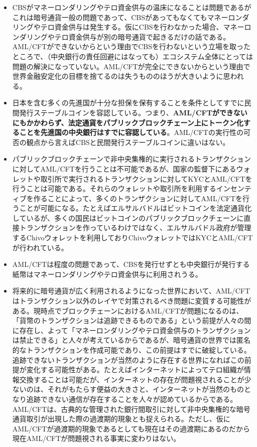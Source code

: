 \documentclass[dvipdfmx,a4paper]{jsarticle}
\begin{document}
\begin{itemize}
\item CBSがマネーロンダリングやテロ資金供与の温床になることは問題であるがこれは暗号通貨一般の問題であって、CBSがあってもなくてもマネーロンダリングやテロ資金供与は発生する。仮にCBSを行わなかった場合、マネーロンダリングやテロ資金供与が別の暗号通貨で起きるだけの話である。AML/CFTができないからという理由でCBSを行わないという立場を取ったところで、（中央銀行の責任回避にはなっても）エコシステム全体にとっては問題の解決になっていない。AML/CFTが完全にできないからという理由で世界金融安定化の目標を捨てるのは失うもののほうが大きいように思われる。
\item 日本を含む多くの先進国が十分な担保を保有することを条件としてすでに民間発行ステーブルコインを容認している。つまり、\textbf{AML/CFTができないにもかかわらず、法定通貨をパブリックブロックチェーン上にトークン化することを先進国の中央銀行はすでに容認している}。AML/CFTの実行性の可否の観点から言えばCBSと民間発行ステーブルコインに違いはない。
\item パブリックブロックチェーンで非中央集権的に実行されるトランザクションに対してAML/CFTを行うことは不可能であるが、国家の監督下にあるウォレットや取引所で実行されるトランザクションに対してKYCとAML/CFTを行うことは可能である。それらのウォレットや取引所を利用するインセンティブを作ることによって、多くのトランザクションに対してAML/CFTを行うことが可能になる。たとえばエルサルバドルはビットコインを法定通貨化しているが、多くの国民はビットコインのパブリックブロックチェーンに直接トランザクションを作っているわけではなく、エルサルバドル政府が管理するChivoウォレットを利用しておりChivoウォレットではKYCとAML/CFTが行われている。
\item AML/CFTは程度の問題であって、CBSを発行せずとも中央銀行が発行する紙幣はマネーロンダリングやテロ資金供与に利用されうる。
\item 将来的に暗号通貨が広く利用されるようになった世界において、AML/CFTはトランザクション以外のレイヤで対策されるべき問題に変質する可能性がある。現時点でブロックチェーンにおけるAML/CFTが問題になるのは、「貨幣のトランザクションは追跡できるものである」という前提が人々の間に存在し、よって「マネーロンダリングやテロ資金供与のトランザクションは禁止できる」と人々が考えているからであるが、暗号通貨の世界では匿名的なトランザクションを作成可能であり、この前提はすでに破綻している。追跡できないトランザクションが当然のように存在する世界になればこの前提が変化する可能性がある。たとえばインターネットによってテロ組織が情報交換することは可能だが、インターネットの存在が問題視されることが少ないのは、それがもたらす便益の大きさと、インターネットが当然のものとなり追跡できない通信が存在することを人々が認めているからである。AML/CFTは、古典的な管理された銀行間取引に対して非中央集権的な暗号通貨取引が出現した際の過渡期的現象とも捉えられる。ただし、仮にAML/CFTが過渡期的現象であるとしても現在はその過渡期にあるのだから現在AML/CFTが問題視される事実に変わりはない。
\end{itemize}
\end{document}
